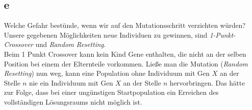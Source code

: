 \documentclass[12pt, a4paper]{article}
\begin{document}
\subsection*{e}
Welche Gefahr bestünde, wenn wir auf den Mutationsschritt verzichten würden?\\
Unsere gegebenen Möglichkeiten neue Individuen zu gewinnen, sind \textit{1-Punkt-Crossover} und \textit{Random Resetting}.\\
Beim 1 Punkt Crossover kann kein Kind Gene enthalten, die nicht an der selben Position bei einem der Elternteile vorkommen. Ließe man die Mutation (\textit{Random Resetting}) nun weg, kann eine Population ohne Individuum mit Gen $X$ an der Stelle $n$ nie ein Individuum mit Gen $X$ an der Stelle $n$ hervorbringen. Das hätte zur Folge, dass bei einer ungünstigen Startpopulation ein Erreichen des vollständigen Lösungsraums nicht möglich ist.
\end{document}
